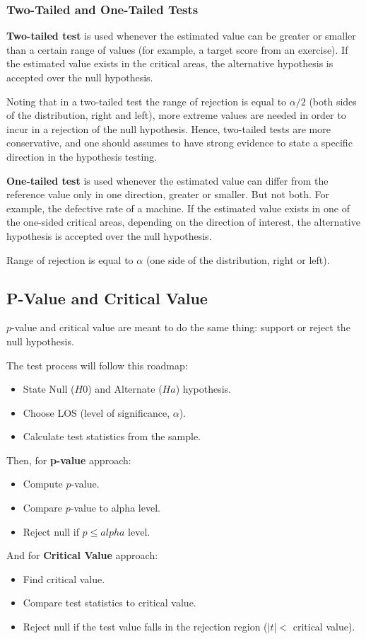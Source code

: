 \documentclass{article}
\begin{document}
\subsubsection{Two-Tailed and One-Tailed Tests}
\textbf{Two-tailed test} is used whenever the estimated value can be greater or smaller than a certain range of values (for example, a target score from an exercise). 
If the estimated value exists in the critical areas, the alternative hypothesis is accepted over the null hypothesis. 

Noting that in a two-tailed test the range of rejection is equal to $\alpha/2$  (both sides of the distribution, right and left), more extreme values are needed in order to incur in a rejection of the null hypothesis. Hence, two-tailed tests are more conservative, and one should assumes to have strong evidence to state a specific direction in the hypothesis testing.

\textbf{One-tailed test} is used whenever the estimated value can differ from the reference value only in one direction, greater or smaller. But not both. For example, the defective rate of a machine. 
If the estimated value exists in one of the one-sided critical areas, depending on the direction of interest, the alternative hypothesis is accepted over the null hypothesis. 

Range of rejection is equal to $\alpha$ (one side of the distribution, right or left).

\subsection{P-Value and Critical Value}
$p$-value and critical value are meant to do the same thing: support or reject the null hypothesis. 

The test process will follow this roadmap:
\begin{itemize}
    \item State Null ($H0$) and Alternate ($Ha$) hypothesis.
    \item Choose LOS (level of significance, $\alpha$).
    \item Calculate test statistics from the sample.
\end{itemize}

Then, for \textbf{p-value} approach:
\begin{itemize}
    \item Compute $p$-value.
    \item Compare $p$-value to alpha level.
    \item Reject null if $p \leq alpha$ level.
\end{itemize}

And for \textbf{Critical Value} approach:
\begin{itemize}
    \item Find critical value.
    \item Compare test statistics to critical value.
    \item Reject null if the test value falls in the rejection region ($|t| <$ critical value).
\end{itemize}
\end{document}
